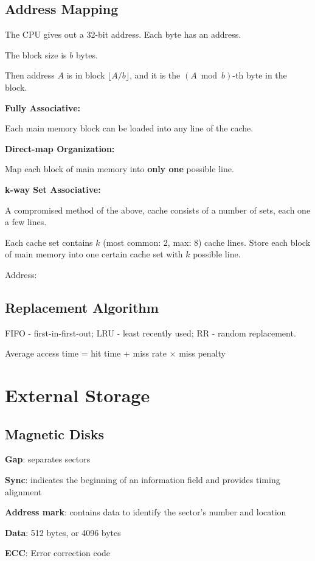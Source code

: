 \documentclass[11pt,a4paper]{article}
\begin{document}
\subsection{Address Mapping}
The CPU gives out a 32-bit address. Each byte has an address. \par
The block size is $b$ bytes. \par
Then address $A$ is in block $\lfloor A/b \rfloor$, and it is the $(A \bmod b)$-th byte in the block.

\textbf{Fully Associative:} \par
Each main memory block can be loaded into any line of the cache. \par

\textbf{Direct-map Organization:} \par
Map each block of main memory into \textbf{only one} possible line. \par

\textbf{k-way Set Associative:} \par
A compromised method of the above, cache consists of a number of sets, each one a few lines. \par
Each cache set contains $k$ (most common: 2, max: 8) cache lines. Store each block of main memory into one certain cache set with $k$ possible line. \par

Address: \par
{}

 \par

\subsection{Replacement Algorithm}
FIFO - first-in-first-out; LRU - least recently used; RR - random replacement. \par
Average access time = hit time + miss rate $\times$ miss penalty

\section{External Storage}
\subsection{Magnetic Disks}
\textbf{Gap}: separates sectors \par
\textbf{Sync}: indicates the beginning of an information field and provides timing alignment \par
\textbf{Address mark}: contains data to identify the sector's number and location \par
\textbf{Data}: 512 bytes, or 4096 bytes \par
\textbf{ECC}: Error correction code \par
{}
\end{document}
